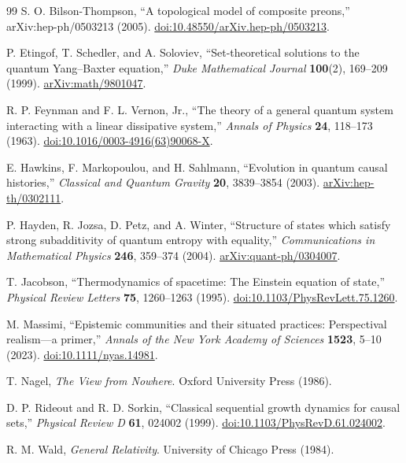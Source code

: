 \documentclass[11pt]{article}
\theoremstyle{definition}
\theoremstyle{remark}
\begin{document}
\begin{thebibliography}{99}
S. O. Bilson-Thompson, ``A topological model of composite preons,'' arXiv:hep-ph/0503213 (2005). \href{https://doi.org/10.48550/arXiv.hep-ph/0503213}{doi:10.48550/arXiv.hep-ph/0503213}.

P. Etingof, T. Schedler, and A. Soloviev, ``Set-theoretical solutions to the quantum Yang--Baxter equation,'' \emph{Duke Mathematical Journal} \textbf{100}(2), 169--209 (1999). \href{https://arxiv.org/abs/math/9801047}{arXiv:math/9801047}.

R. P. Feynman and F. L. Vernon, Jr., ``The theory of a general quantum system interacting with a linear dissipative system,'' \emph{Annals of Physics} \textbf{24}, 118--173 (1963). \href{https://doi.org/10.1016/0003-4916(63)90068-X}{doi:10.1016/0003-4916(63)90068-X}.

E. Hawkins, F. Markopoulou, and H. Sahlmann, ``Evolution in quantum causal histories,'' \emph{Classical and Quantum Gravity} \textbf{20}, 3839--3854 (2003). \href{https://arxiv.org/abs/hep-th/0302111}{arXiv:hep-th/0302111}.

P. Hayden, R. Jozsa, D. Petz, and A. Winter, ``Structure of states which satisfy strong subadditivity of quantum entropy with equality,'' \emph{Communications in Mathematical Physics} \textbf{246}, 359--374 (2004). \href{https://arxiv.org/abs/quant-ph/0304007}{arXiv:quant-ph/0304007}.

T. Jacobson, ``Thermodynamics of spacetime: The Einstein equation of state,'' \emph{Physical Review Letters} \textbf{75}, 1260--1263 (1995). \href{https://doi.org/10.1103/PhysRevLett.75.1260}{doi:10.1103/PhysRevLett.75.1260}.

M. Massimi, ``Epistemic communities and their situated practices: Perspectival realism---a primer,'' \emph{Annals of the New York Academy of Sciences} \textbf{1523}, 5--10 (2023). \href{https://doi.org/10.1111/nyas.14981}{doi:10.1111/nyas.14981}.

T. Nagel, \emph{The View from Nowhere}. Oxford University Press (1986).

D. P. Rideout and R. D. Sorkin, ``Classical sequential growth dynamics for causal sets,'' \emph{Physical Review D} \textbf{61}, 024002 (1999). \href{https://doi.org/10.1103/PhysRevD.61.024002}{doi:10.1103/PhysRevD.61.024002}.

R. M. Wald, \emph{General Relativity}. University of Chicago Press (1984).


\end{thebibliography}
\end{document}
